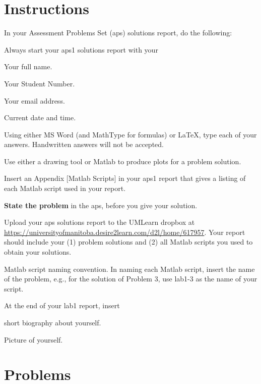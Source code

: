 \documentclass{amsart}
\begin{document}
\section{Instructions}
In your Assessment Problems Set (aps) solutions report, do the following:
\begin{compactenum}[{Do}1$^o$]
\item Always start your aps1 solutions report with your
\begin{compactenum}[$\bullet$.1]
\item Your full name.
\item Your Student Number.
\item Your email address.
\item Current date and time.
\end{compactenum}
\item Using either MS Word (and MathType for formulas) or \LaTeX, type each of your answers.
\colorbox{magenta!15}{Handwritten answers will not be accepted.}
\item Use either a drawing tool or Matlab to produce plots for a problem solution.
\item Insert an Appendix [Matlab Scripts] in your aps1 report that gives a listing of each Matlab script used in your report.  
\item \colorbox{brown!15}{\bf State the problem} in the aps, before you give your solution.
\item Upload your aps solutions report to the UMLearn dropbox at \url{https://universityofmanitoba.desire2learn.com/d2l/home/617957}.  Your report should include your (1) problem solutions and (2) all Matlab scripts you used to obtain your solutions.
\item \colorbox{green!15}{Matlab script naming convention}.  In naming each Matlab script, insert the name of the problem, e.g., for the solution of Problem 3, use \colorbox{brown!15}{lab1-3} as the name of your script.
\item At the end of your lab1 report, insert
\begin{compactenum}[(i)]
\item short biography about yourself.
\item Picture of yourself.
\end{compactenum}
\end{compactenum}

\section{Problems}
\end{document}
